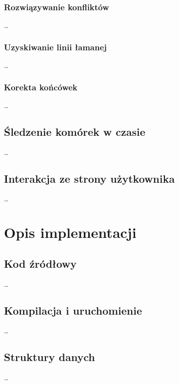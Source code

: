 \documentclass[declaration,shortabstract,mgr]{iithesis}
\begin{document}
\subsection{Rozwiązywanie konfliktów}

\ldots %

\subsection{Uzyskiwanie linii łamanej}

\ldots %


\subsection{Korekta końcówek}

\ldots %


\section{Śledzenie komórek w czasie}
\label{sec:cell-tracking}

\ldots %


\section{Interakcja ze strony użytkownika}

\ldots %



\chapter{Opis implementacji}

\section{Kod źródłowy}
\ldots %
\section{Kompilacja i uruchomienie}
\ldots %
\section{Struktury danych}
\ldots %
\end{document}
